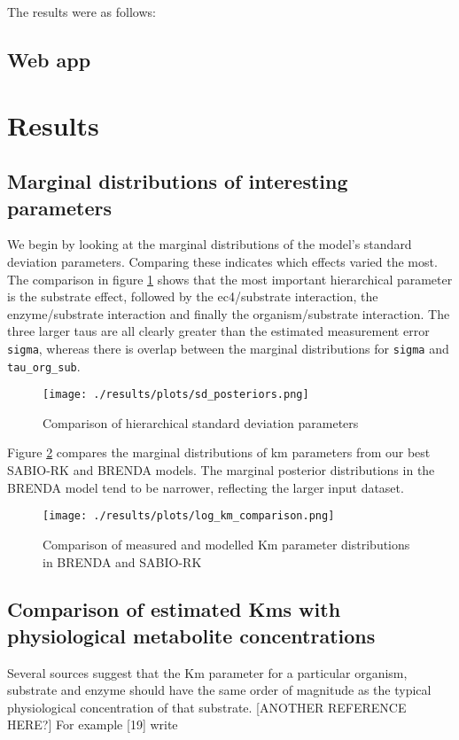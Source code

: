 \documentclass[11pt]{article}
\makeatletter
\newcommand{\citeprocitem}[2]{\hyper@linkstart{cite}{citeproc_bib_item_#1}#2\hyper@linkend}
\makeatother
\begin{document}
The results were as follows:

\subsection{Web app}
\label{sec:org90ac148}
\section{Results}
\label{sec:org0dac0a5}
\subsection{Marginal distributions of interesting parameters}
\label{sec:org7d66e87}
We begin by looking at the marginal distributions of the model's standard
deviation parameters. Comparing these indicates which effects varied the
most. The comparison in figure \ref{fig:org87fd0cc} shows that the most important
hierarchical parameter is the substrate effect, followed by the ec4/substrate
interaction, the enzyme/substrate interaction and finally the organism/substrate
interaction. The three larger taus are all clearly greater than the estimated
measurement error \texttt{sigma}, whereas there is overlap between the marginal
distributions for \texttt{sigma} and \texttt{tau\_org\_sub}.

\begin{figure}[htbp]
\centering
\texttt{[image: ./results/plots/sd\_posteriors.png]}
\caption{\label{fig:org87fd0cc}Comparison of hierarchical standard deviation parameters}
\end{figure}

Figure \ref{fig:org9c32565} compares the marginal distributions of km
parameters from our best SABIO-RK and BRENDA models. The marginal posterior
distributions in the BRENDA model tend to be narrower, reflecting the larger
input dataset.

\begin{figure}[htbp]
\centering
\texttt{[image: ./results/plots/log\_km\_comparison.png]}
\caption{\label{fig:org9c32565}Comparison of measured and modelled Km parameter distributions in BRENDA and SABIO-RK}
\end{figure}

\subsection{Comparison of estimated Kms with physiological metabolite concentrations}
\label{sec:orgf96003e}
Several sources suggest that the Km parameter for a particular organism,
substrate and enzyme should have the same order of magnitude as the typical
physiological concentration of that substrate. [ANOTHER REFERENCE HERE?] For example
\citeprocitem{19}{[19]} write
\end{document}

